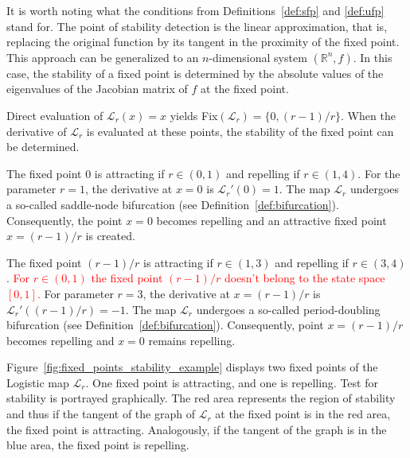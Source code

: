 \begin{remark}
        It is worth noting what the conditions from Definitions~\ref{def:sfp} and \ref{def:ufp} stand for.
        The point of stability detection is the linear approximation, that is, replacing the original function by its tangent in the proximity of the fixed point.
        This approach can be generalized to an $n$-dimensional system $\left( \mathbb{R}^{n}, f \right)$.
        In this case, the stability of a fixed point is determined by the absolute values of the eigenvalues of the Jacobian matrix of $f$ at the fixed point.
    \par
    Direct evaluation of $\mathcal{L}_{r}(x)=x$ yields Fix$(\mathcal{L}_{r}) = \{ 0, (r-1)/r \}$.
    When the derivative of $\mathcal{L}_{r}$ is evaluated at these points, the stability of the fixed point can be determined.
    \par
    The fixed point $0$ is attracting if $r \in (0, 1)$ and repelling if $r \in (1, 4)$.
    For the parameter $r = 1$, the derivative at $x=0$ is $\mathcal{L}_{r}'(0)=1$.
    The map $\mathcal{L}_{r}$ undergoes a so-called saddle-node bifurcation (see Definition~\ref{def:bifurcation}).
    Consequently, the point $x=0$ becomes repelling and an attractive fixed point $x=(r-1)/r$ is created.
    \par
    The fixed point $(r-1)/r$ is attracting if $r \in (1, 3)$ and repelling if $r \in (3, 4) $.
    \textcolor{red}{For $r \in (0, 1)$ the fixed point $(r-1)/r$ doesn't belong to the state space $[0, 1]$.}
    For parameter $r = 3$, the derivative at $x=(r-1)/r$ is $\mathcal{L}_{r}'((r-1)/r)=-1$.
    The map $\mathcal{L}_{r}$ undergoes a so-called period-doubling bifurcation (see Definition~\ref{def:bifurcation}).
    Consequently, point $x=(r-1)/r$ becomes repelling and $x=0$ remains repelling.
    \par
    Figure~\ref{fig:fixed_points_stability_example} displays two fixed points of the Logistic map $\mathcal{L}_{r}$.
    One fixed point is attracting, and one is repelling.
    Test for stability is portrayed graphically.
    The red area represents the region of stability and thus if the tangent of the graph of $\mathcal{L}_{r}$ at the fixed point is in the red area, the fixed point is attracting.
    Analogously, if the tangent of the graph is in the blue area, the fixed point is repelling.
\end{remark}

